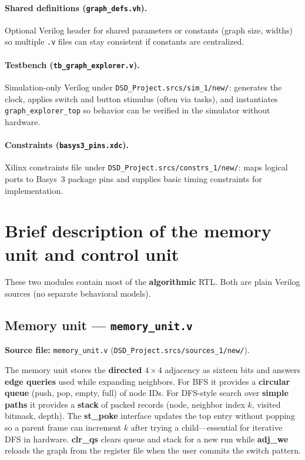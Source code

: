 \documentclass[11pt,a4paper]{article}
\newcommand{\srcpath}{\texttt{DSD\_Project.srcs/sources\_1/new/}}
\newcommand{\simpath}{\texttt{DSD\_Project.srcs/sim\_1/new/}}
\newcommand{\conpath}{\texttt{DSD\_Project.srcs/constrs\_1/new/}}
\begin{document}
\paragraph{Shared definitions (\texttt{graph\_defs.vh}).}
Optional Verilog header for shared parameters or constants (graph size, widths) so multiple \texttt{.v} files can stay consistent if constants are centralized.

\paragraph{Testbench (\texttt{tb\_graph\_explorer.v}).}
Simulation-only Verilog under \simpath{}: generates the clock, applies switch and button stimulus (often via tasks), and instantiates \texttt{graph\_explorer\_top} so behavior can be verified in the simulator without hardware.

\paragraph{Constraints (\texttt{basys3\_pins.xdc}).}
Xilinx constraints file under \conpath{}: maps logical ports to Basys~3 package pins and supplies basic timing constraints for implementation.

\section{Brief description of the memory unit and control unit}
\label{sec:memcu}

These two modules contain most of the \textbf{algorithmic} RTL. Both are plain Verilog sources (no separate behavioral models).

\subsection{Memory unit — \texttt{memory\_unit.v}}
\textbf{Source file:} \texttt{memory\_unit.v} (\srcpath).

The memory unit stores the \textbf{directed} $4\times4$ adjacency as sixteen bits and answers \textbf{edge queries} used while expanding neighbors. For BFS it provides a \textbf{circular queue} (push, pop, empty, full) of node IDs. For DFS-style search over \textbf{simple paths} it provides a \textbf{stack} of packed records (node, neighbor index $k$, visited bitmask, depth). The \textbf{st\_poke} interface updates the top entry without popping so a parent frame can increment $k$ after trying a child—essential for iterative DFS in hardware. \textbf{clr\_qs} clears queue and stack for a new run while \textbf{adj\_we} reloads the graph from the register file when the user commits the switch pattern.
\end{document}
